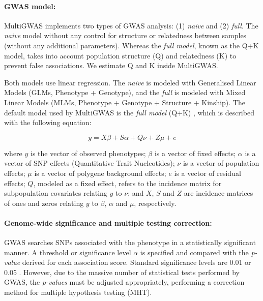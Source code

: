 \documentclass{article}
\begin{document}
\paragraph{GWAS model:}
MultiGWAS implements two types of GWAS analysis: (1) \textit{naive} and (2) \textit{full}. The \textit{naive} model without any control for structure or relatedness between samples (without any additional parameters). Whereas the \textit{full model}, known as the Q+K model, takes into account population structure (Q) and relatedness (K) to prevent false associations. We estimate Q and K inside MultiGWAS. 

Both models use linear regression. The \emph{naive} is modeled with Generalised Linear Models (GLMs, Phenotype + Genotype), and the \emph{full} is modeled with Mixed Linear Models (MLMs, Phenotype + Genotype + Structure + Kinship). The default model used by MultiGWAS is the \emph{full model} (Q+K) \cite{Yu2006}, which is described with the following equation:

\[
y=X\beta+S\alpha+Q\nu+Z\mu+e
\]

where $y$ is the vector of observed phenotypes; $\beta$ is a vector of fixed effects; $\alpha$ is a vector of SNP effects (Quantitative Trait Nucleotides); $\nu$ is a vector of population effects; $\mu$ is a vector of polygene background effects; $e$ is a vector of residual effects; $Q$, modeled as a fixed effect, refers to the incidence matrix for subpopulation covariates relating $y$ to $\nu$; and $X$, $S$ and $Z$ are incidence matrices of ones and zeros relating $y$ to $\beta$, $\alpha$ and $\mu$, respectively.



\paragraph{Genome-wide significance and multiple testing correction:}
GWAS searches SNPs associated with the phenotype in a statistically significant manner. A threshold or significance level $\alpha$ is specified and compared with the \emph{p-value} derived for each association score. Standard significance levels are 0.01 or 0.05 \cite{Gumpinger2018,Rosyara2016}.  However, due to the massive number of statistical tests performed by GWAS, the \emph{p-values} must be adjusted appropriately, performing a correction method for multiple hypothesis testing (MHT). 
\end{document}
